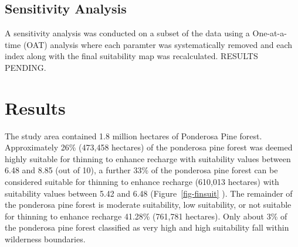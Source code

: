 \documentclass[
  number,
  preprint,
  3p,
  onecolumn]{elsarticle}
\begin{document}
\subsection{Sensitivity Analysis}\label{sensitivity-analysis}

A sensitivity analysis was conducted on a subset of the data using a
One-at-a-time (OAT) analysis where each paramter was systematically
removed and each index along with the final suitability map was
recalculated. RESULTS PENDING.

\section{Results}\label{results}

The study area contained 1.8 million hectares of Ponderosa Pine forest.
Approximately 26\% (473,458 hectares) of the ponderosa pine forest was
deemed highly suitable for thinning to enhance recharge with suitability
values between 6.48 and 8.85 (out of 10), a further 33\% of the
ponderosa pine forest can be considered suitable for thinning to enhance
recharge (610,013 hectares) with suitability values between 5.42 and
6.48 (Figure~\ref{fig-finsuit} ). The remainder of the ponderosa pine
forest is moderate suitability, low suitability, or not suitable for
thinning to enhance recharge 41.28\% (761,781 hectares). Only about 3\%
of the ponderosa pine forest classified as very high and high
suitability fall within wilderness boundaries.
\end{document}
